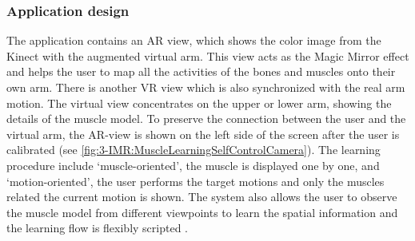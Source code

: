 \subsubsection{Application design}
The application contains an AR view, which shows the color image from the Kinect with the augmented virtual arm. This view acts as the Magic Mirror effect and helps the user to map all the activities of the bones and muscles onto their own arm. There is another VR view which is also synchronized with the real arm motion. The virtual view concentrates on the upper or lower arm, showing the details of the muscle model. To preserve the connection between the user and the virtual arm, the AR-view is shown on the left side of the screen after the user is calibrated (see \figurename{\ref{fig:3-IMR:MuscleLearningSelfControlCamera}}). 
The learning procedure include `muscle-oriented', the muscle is displayed one by one, and `motion-oriented', the user performs the target motions and only the muscles related the current motion is shown. 
The system also allows the user to observe the muscle model from different viewpoints to learn the spatial information and the learning flow is flexibly scripted \cite{Jutzi2015}. 

